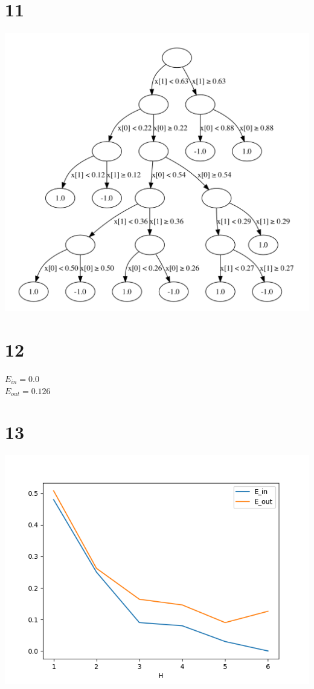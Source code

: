 \documentclass[12pt]{article}
\begin{document}
\section*{11}
\begin{center}
    \includegraphics[scale=0.4]{p11.png}
\end{center}

\section*{12}
$E_{in} = 0.0$ \\
$E_{out}  = 0.126$

\section*{13}
\begin{center}
    \includegraphics[scale=0.5]{p13.png}
\end{center}
\end{document}
